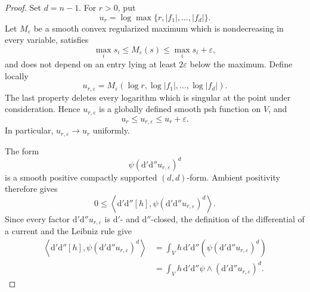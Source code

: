 \begin{proof}
Set $d=n-1$.  For $r>0$, put
\[
 u_r=\log\max\{r,|f_1|,\ldots,|f_d|\}.
\]
Let $M_\varepsilon$ be a smooth convex regularized maximum which is
nondecreasing in every variable, satisfies
\[
 \max_i s_i\leq M_\varepsilon(s)\leq\max_i s_i+\varepsilon,
\]
and does not depend on an entry lying at least $2\varepsilon$ below the
maximum.  Define locally
\[
 u_{r,\varepsilon}
 =M_\varepsilon(\log r,\log|f_1|,\ldots,\log|f_d|).
\]
The last property deletes every logarithm which is singular at the point
under consideration.  Hence $u_{r,\varepsilon}$ is a globally defined smooth
psh function on $V$, and
\[
 u_r\leq u_{r,\varepsilon}\leq u_r+\varepsilon.
\]
In particular, $u_{r,\varepsilon}\to u_r$ uniformly.

The form
\[
 \psi(\mathrm d'\mathrm d''u_{r,\varepsilon})^d
\]
is a smooth positive compactly supported $(d,d)$-form.  Ambient positivity
therefore gives
\begin{equation}
\label{eq:p01-positive-approximating-slice}
0\leq
\left\langle\mathrm d'\mathrm d''[h],
 \psi(\mathrm d'\mathrm d''u_{r,\varepsilon})^d\right\rangle.
\end{equation}
Since every factor $\mathrm d'\mathrm d''u_{r,\varepsilon}$ is
$\mathrm d'$- and $\mathrm d''$-closed, the definition of the differential
of a current and the Leibniz rule give
\begin{align}
\left\langle\mathrm d'\mathrm d''[h],
 \psi(\mathrm d'\mathrm d''u_{r,\varepsilon})^d\right\rangle
&=
\int_V h\,\mathrm d'\mathrm d''\!\left(
 \psi(\mathrm d'\mathrm d''u_{r,\varepsilon})^d\right)\\
&=
\int_V h\,\mathrm d'\mathrm d''\psi\wedge
 (\mathrm d'\mathrm d''u_{r,\varepsilon})^d.
\label{eq:p01-integration-by-parts-slice}
\end{align}


\end{proof}
